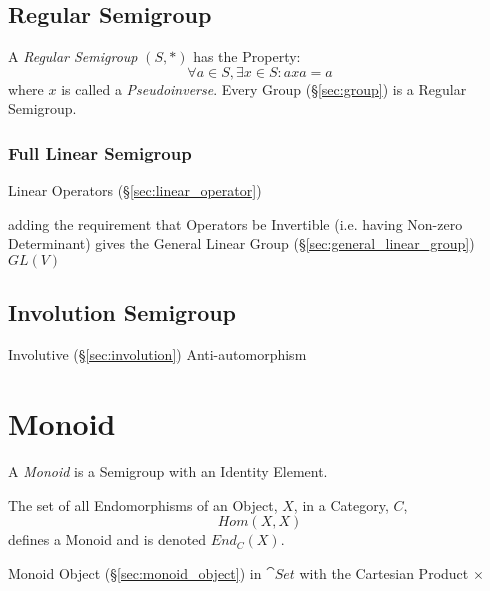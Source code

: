\subsection{Regular Semigroup}\label{sec:regular_semigroup}

A \emph{Regular Semigroup} $(S,*)$ has the Property:
\[
  \forall a \in S, \exists x \in S : axa = a
\]
where $x$ is called a \emph{Pseudoinverse}. Every Group
(\S\ref{sec:group}) is a Regular Semigroup.



\subsubsection{Full Linear Semigroup}\label{sec:full_linear_semigroup}

Linear Operators (\S\ref{sec:linear_operator})

adding the requirement that Operators be Invertible (i.e. having Non-zero
Determinant) gives the General Linear Group (\S\ref{sec:general_linear_group})
$GL(V)$



\subsection{Involution Semigroup}\label{sec:involution_semigroup}

Involutive (\S\ref{sec:involution}) Anti-automorphism



\section{Monoid}\label{sec:monoid}

A \emph{Monoid} is a Semigroup with an Identity Element.

The set of all Endomorphisms of an Object, $X$, in a Category, $C$,
\[
    Hom(X,X)
\]
defines a Monoid and is denoted $End_C(X)$.

Monoid Object (\S\ref{sec:monoid_object}) in $\cat{Set}$ with the
Cartesian Product $\times$



